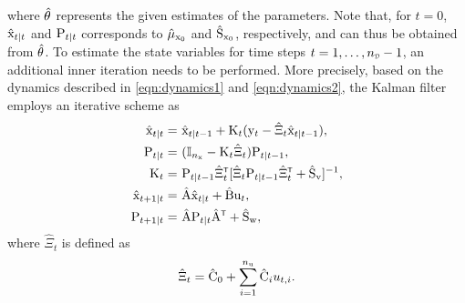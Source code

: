 where $\hat{{ \mathrm{\theta} }}$ represents the given estimates of the parameters. 
%
%
% 
%
Note that, for $t=0$, $\hat{{ \mathrm{x} }}_{t|t}$ and ${ \mathrm{P} }_{t|t}$ corresponds to $\hat{\mu}_{{ \mathrm{x} }_0}$ and $\hat{{ \mathrm{S} }}_{{ \mathrm{x} }_0}$, respectively, and can thus be obtained from $\hat{{ \mathrm{\theta} }}$.
To estimate the state variables for time steps $t = 1, \ldots, \nD-1$, an additional inner iteration needs to be performed. More precisely, based on the dynamics described in \eqref{eqn:dynamics1} and \eqref{eqn:dynamics2}, the Kalman filter employs an iterative scheme as
\begin{equation}\label{eq:kalman filter}
    \begin{split}
        \hat{\vcx}_{t|t}   =&\,\, \hat{\vcx}_{t|t-1} + \mxK_t(\vcy_t - \hat{\Xi}_t \hat{\vcx}_{t|t-1}),\\
        \mxP_{t|t}   =&\,\, (\mathbb{I}_{\Nx} - \mxK_t \hat{\Xi}_t)\mxP_{t|t-1},\\
        \mxK_t   =&\,\, \mxP_{t|t-1}\hat{\Xi}_t^\tr[\hat{\Xi}_t \mxP_{t|t-1}\hat{\Xi}_t^\tr + \hat{\mxS}_\vcv]^{-1},\\
        \hat{\vcx}_{t+1|t}   =&\,\, \hat{\mxA}\hat{\vcx}_{t|t} + \hat{\mxB} \vcu_{t},\\
        \mxP_{t+1|t}   =&\,\, \hat{\mxA}\mxP_{t|t}\hat{\mxA}^\tr + \hat{\mxS}_\vcw,\\
    \end{split}
\end{equation}
where $\hat{\Xi}_t$ is defined as
\begin{equation}
\hat{\Xi}_t = \hat{{ \mathrm{C} }}_0 + \sum_{i=1}^{n_{ \mathrm{u} }} \hat{{ \mathrm{C} }}_iu_{t,i}.    
\end{equation}
%
